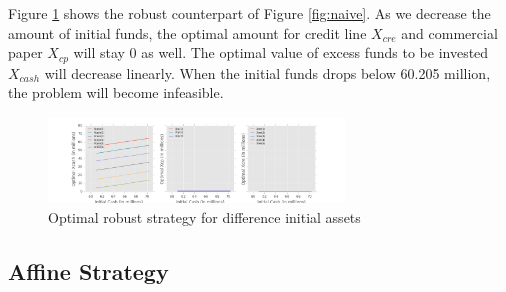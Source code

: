 \documentclass[letterpaper, 10 pt, conference]{ieeeconf}
\begin{document}
    Figure \ref{fig:robust} shows the robust counterpart of Figure \ref{fig:naive}. As we decrease the amount of initial funds, the optimal amount for credit line $X_{cre}$ and commercial paper $X_{cp}$ will stay 0 as well. The optimal value of excess funds to be invested $X_{cash}$ will decrease linearly. When the initial funds drops below 60.205 million, the problem will become infeasible.
    \begin{figure}
	   \centering
	   \includegraphics[width=0.7\textwidth]{robust.png}
        \caption{Optimal robust strategy for difference initial assets}
        \label{fig:robust}
    \end{figure}  


\subsection{Affine Strategy}
\end{document}
